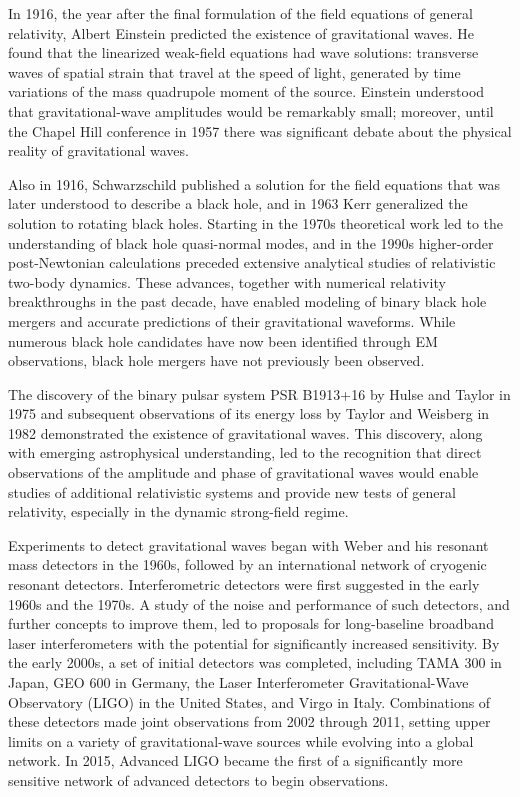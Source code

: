 \documentclass[a4paper,10pt]{article}
\begin{document}
In 1916, the year after the final formulation of the field equations of general relativity, Albert Einstein predicted the existence of gravitational waves. He found that the linearized weak-field equations had wave solutions: transverse waves of spatial strain that travel at the speed of light, generated by time variations of the mass quadrupole moment of the source. Einstein understood that gravitational-wave amplitudes would be remarkably small; moreover, until the Chapel Hill conference in 1957 there was significant debate about the physical reality of gravitational waves.

{\noindent}Also in 1916, Schwarzschild published a solution for the field equations that was later understood to describe a black hole, and in 1963 Kerr generalized the solution to rotating black holes. Starting in the 1970s theoretical work led to the understanding of black hole quasi-normal modes, and in the 1990s higher-order post-Newtonian calculations preceded extensive analytical studies of relativistic two-body dynamics. These advances, together with numerical relativity breakthroughs in the past decade, have enabled modeling of binary black hole mergers and accurate predictions of their gravitational waveforms. While numerous black hole candidates have now been identified through EM observations, black hole mergers have not previously been observed.

{\noindent}The discovery of the binary pulsar system PSR B1913+16 by Hulse and Taylor in 1975 and subsequent observations of its energy loss by Taylor and Weisberg in 1982 demonstrated the existence of gravitational waves. This discovery, along with emerging astrophysical understanding, led to the recognition that direct observations of the amplitude and phase of gravitational waves would enable studies of additional relativistic systems and provide new tests of general relativity, especially in the dynamic strong-field regime.

{\noindent}Experiments to detect gravitational waves began with Weber and his resonant mass detectors in the 1960s, followed by an international network of cryogenic resonant detectors. Interferometric detectors were first suggested in the early 1960s and the 1970s. A study of the noise and performance of such detectors, and further concepts to improve them, led to proposals for long-baseline broadband laser interferometers with the potential for significantly increased sensitivity. By the early 2000s, a set of initial detectors was completed, including TAMA 300 in Japan, GEO 600 in Germany, the Laser Interferometer Gravitational-Wave Observatory (LIGO) in the United States, and Virgo in Italy. Combinations of these detectors made joint observations from 2002 through 2011, setting upper limits on a variety of gravitational-wave sources while evolving into a global network. In 2015, Advanced LIGO became the first of a significantly more sensitive network of advanced detectors to begin observations.
\end{document}
